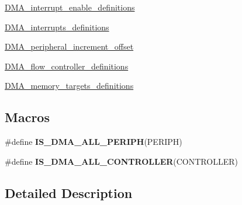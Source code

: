\begin{DoxyCompactItemize}
\item 
\hyperlink{group___d_m_a__interrupt__enable__definitions}{D\-M\-A\-\_\-interrupt\-\_\-enable\-\_\-definitions}
\item 
\hyperlink{group___d_m_a__interrupts__definitions}{D\-M\-A\-\_\-interrupts\-\_\-definitions}
\item 
\hyperlink{group___d_m_a__peripheral__increment__offset}{D\-M\-A\-\_\-peripheral\-\_\-increment\-\_\-offset}
\item 
\hyperlink{group___d_m_a__flow__controller__definitions}{D\-M\-A\-\_\-flow\-\_\-controller\-\_\-definitions}
\item 
\hyperlink{group___d_m_a__memory__targets__definitions}{D\-M\-A\-\_\-memory\-\_\-targets\-\_\-definitions}
\end{DoxyCompactItemize}
\subsection*{Macros}
\begin{DoxyCompactItemize}
\item 
\#define {\bfseries I\-S\-\_\-\-D\-M\-A\-\_\-\-A\-L\-L\-\_\-\-P\-E\-R\-I\-P\-H}(P\-E\-R\-I\-P\-H)
\item 
\#define {\bfseries I\-S\-\_\-\-D\-M\-A\-\_\-\-A\-L\-L\-\_\-\-C\-O\-N\-T\-R\-O\-L\-L\-E\-R}(C\-O\-N\-T\-R\-O\-L\-L\-E\-R)
\end{DoxyCompactItemize}


\subsection{Detailed Description}


